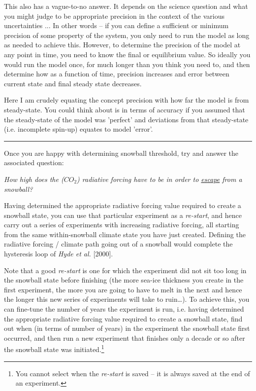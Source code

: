 This also has a vague-to-no answer. It depends on the science question and what you might judge to be appropriate precision in the context of the various uncertainties ... In other words -- if you can define a sufficient or minimum precision of some property of the system, you only need to run the model as long as needed to achieve this. However, to determine  the precision of the model at any point in time, you need to know the final or equilibrium value. So ideally you would run the model once, for much longer than you think you need to, and then determine how as a function of time, precision increases and error between current state and final steady state decreases.

Here I am crudely equating the concept precision with how far the model is from steady-state. You could think about is in terms of accuracy if you assumed that the steady-state of the model was 'perfect' and deviations from that steady-state (i.e. incomplete spin-up) equates to model 'error'.

\vspace{1mm}
\noindent\rule{4cm}{0.5pt}
\vspace{2mm}

\noindent Once you are happy  with determining snowball threshold, try and answer the associated question:

\vspace{2mm}
\noindent \textit{How high does the (\(CO_{2}\)) radiative forcing have to be in order to \uline{escape} from a snowball?}
\vspace{2mm}

\noindent Having determined the appropriate radiative forcing value required to create a snowball state, you can use that particular experiment as a \textit{re-start}, and hence carry out a series of experiments with increasing radiative forcing, all starting from the same within-snowball climate state you have just created. Defining the radiative forcing / climate path going out of a snowball would complete the hysteresis loop of \textit{Hyde et al.} [2000]. 

Note that a good \textit{re-start} is one for which the experiment did not sit too long in the snowball state before finishing (the more sea-ice thickness you create in the first experiment, the more you are going to have to melt in the next and hence the longer this new series of experiments will take to ruin…). To achieve this, you can fine-tune the number of years the experiment is run, i.e. having determined the appropriate radiative forcing value required to create a snowball state, find out when (in terms of number of years) in the experiment the snowball state first occurred, and then run a new experiment that finishes only a decade or so after the snowball state was initiated.\footnote{You cannot select when the \textit{re-start} is saved – it is always saved at the end of an experiment.}

